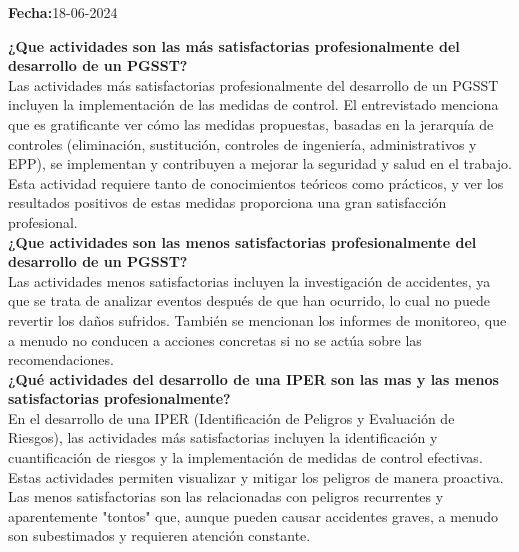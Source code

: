 \noindent
\textbf{Fecha:}18-06-2024

\noindent
\textbf{¿Que actividades son las más satisfactorias profesionalmente del desarrollo de un PGSST?}\\
Las actividades más satisfactorias profesionalmente del desarrollo de un PGSST incluyen la implementación de las medidas de control. El entrevistado menciona que es gratificante ver cómo las medidas propuestas, basadas en la jerarquía de controles (eliminación, sustitución, controles de ingeniería, administrativos y EPP), se implementan y contribuyen a mejorar la seguridad y salud en el trabajo. Esta actividad requiere tanto de conocimientos teóricos como prácticos, y ver los resultados positivos de estas medidas proporciona una gran satisfacción profesional.
\\
\noindent
\textbf{¿Que actividades son las menos satisfactorias profesionalmente del desarrollo de un PGSST?}\\
Las actividades menos satisfactorias incluyen la investigación de accidentes, ya que se trata de analizar eventos después de que han ocurrido, lo cual no puede revertir los daños sufridos. También se mencionan los informes de monitoreo, que a menudo no conducen a acciones concretas si no se actúa sobre las recomendaciones.
\\
\noindent
\textbf{¿Qué actividades del desarrollo de una IPER son las mas y las menos satisfactorias profesionalmente?}\\
En el desarrollo de una IPER (Identificación de Peligros y Evaluación de Riesgos), las actividades más satisfactorias incluyen la identificación y cuantificación de riesgos y la implementación de medidas de control efectivas. Estas actividades permiten visualizar y mitigar los peligros de manera proactiva. Las menos satisfactorias son las relacionadas con peligros recurrentes y aparentemente "tontos" que, aunque pueden causar accidentes graves, a menudo son subestimados y requieren atención constante.
